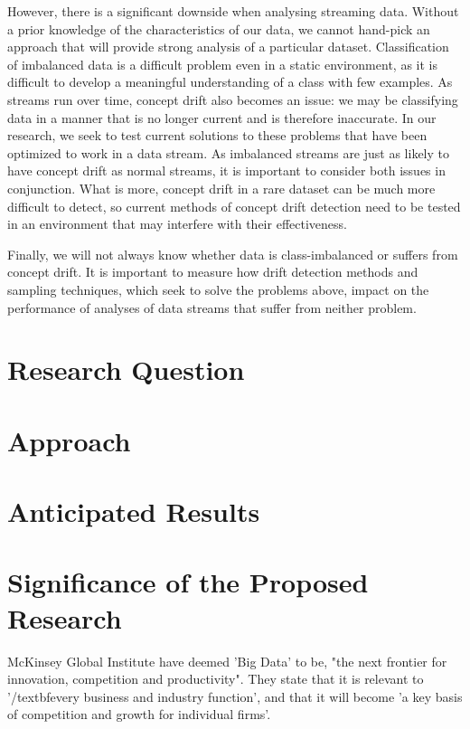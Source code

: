 \documentclass[11pt]{article}\usepackage[]{graphicx}\usepackage[]{color}
\begin{document}
However, there is a significant downside when analysing streaming data. Without a prior knowledge of the characteristics of our data, we cannot hand-pick an approach that will provide strong analysis of a particular dataset. Classification of imbalanced data is a difficult problem even in a static environment, as it is difficult to develop a meaningful understanding of a class with few examples. As streams run over time, concept drift also becomes an issue: we may be classifying data in a manner that is no longer current and is therefore inaccurate. In our research, we seek to test current solutions to these problems that have been optimized to work in a data stream. As imbalanced streams are just as likely to have concept drift as normal streams, it is important to consider both issues in conjunction. What is more, concept drift in a rare dataset can be much more difficult to detect, so current methods of concept drift detection need to be tested in an environment that may interfere with their effectiveness.

Finally, we will not always know whether data is class-imbalanced or suffers from concept drift. It is important to measure how drift detection methods and sampling techniques, which seek to solve the problems above, impact on the performance of analyses of data streams that suffer from neither problem.

\section{Research Question}

\section{Approach}

\section{Anticipated Results}

\section{Significance of the Proposed Research}

McKinsey Global Institute \cite{mckinsey} have deemed 'Big Data' to be, "the next frontier for innovation, competition and productivity". They state that it is relevant to '/textbf{every} business and industry function', and that it will become 'a key basis of competition and growth for individual firms'.
\end{document}
